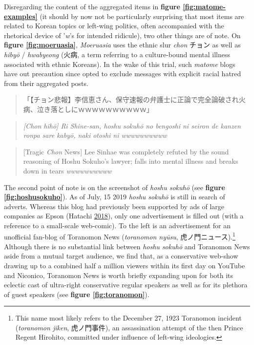 \documentclass[10pt,british,A4paper,twoside]{memoir}
\begin{document}
Disregarding the content of the aggregated items in \textbf{figure
\ref{fig:matome-examples}} (it should by now not be particularly
surprising that most items are related to Korean topics or left-wing
politics, often accompanied with the rhetorical device of '\emph{w}'s
for intended ridicule), two other things are of note. On \textbf{figure
\ref{fig:moeruasia}}, \emph{Moeruasia} uses the ethnic slur \emph{chon}
チョン as well as \emph{hibyō} / \emph{hwabyeong} (火病, a term
referring to a culture-bound mental illness associated with ethnic Koreans). In the wake of this trial,
such \emph{matome} blogs have out precaution since opted to exclude
messages with explicit racial hatred from their aggregated posts.

\begin{quote}
「【チョン悲報】李信恵さん、保守速報の弁護士に正論で完全論破され火病、泣き落としにｗｗｗｗｗｗｗｗｗｗ」
\end{quote}

\begin{quote}
\emph{{[}Chon hihō{]} Ri Shine-san, hoshu sokuhō no bengoshi ni seiron
de kanzen ronpa sare kabyō, naki otoshi ni wwwwwwwwww}
\end{quote}

\begin{quote}
{[}Tragic \emph{Chon} News{]} Lee Sinhae was completely refuted by the
sound reasoning of Hoshu Sokuho's lawyer; falls into mental illness and
breaks down in tears \emph{wwwwwwwwww}
\end{quote}

The second point of note is on the screenshot of \emph{hoshu sokuhō}
(see \textbf{figure \ref{fig:hoshusokuho}}). As of July, 15 2019
\emph{hoshu sokuhō} is still in search of adverts. Whereas this blog had
previously been supported by ads of large companies as Epson (Hatachi
\protect\hyperlink{ref-hatachi__2018}{2018}), only one advertisement is
filled out (with a reference to a small-scale web-comic). To the left is
an advertisement for an unofficial fan-blog of Toranomon News
(\emph{toranomon nyūsu}, 虎ノ門ニュース).\footnote{This name most likely
  refers to the December 27, 1923 Toranomon incident (\emph{toranomon
  jiken}, 虎ノ門事件), an assassination attempt of the then Prince
  Regent Hirohito, committed under influence of left-wing ideologies.}
Although there is no substantial link between \emph{hoshu sokuhō} and
Toranomon News aside from a mutual target audience, we find that, as a
conservative web-show drawing up to a combined half a million viewers
within its first day on YouTube and Niconico, Toranomon News is worth
briefly expanding upon for both its eclectic cast of ultra-right
conservative regular speakers as well as for its plethora of guest
speakers (see \textbf{figure \ref{fig:toranomon}}).
\end{document}
